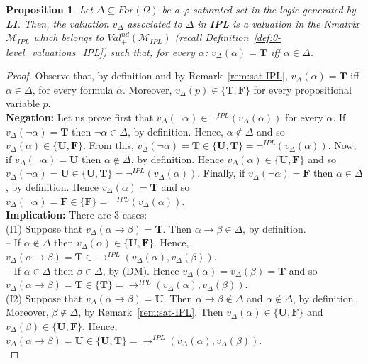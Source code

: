 \documentclass[12pt]{article}
\newtheorem{proposition}[theorem]{Proposition}
\newcommand{\bT}{\mathbf{T}}
\newcommand{\bU}{\mathbf{U}}
\newcommand{\bF}{\mathbf{F}}
\begin{document}
\begin{proposition} \label{prop:val-Delta-IPL}
Let $\Delta \subseteq For(\Omega)$ be a $\varphi$-saturated set in the logic generated by {\bf LI}. Then, the valuation $v_\Delta$ associated to $\Delta$ in \textbf{IPL} is a valuation in the Nmatrix $\mathcal{M}_{IPL}$ which belongs to $Val^{nd}_+(\mathcal{M}_{IPL})$ (recall Definition~\ref{def:0-level_valuations_IPL}) such that, for every $\alpha$: $v_\Delta(\alpha)=\bT$ iff $\alpha \in \Delta$.
\end{proposition}
\begin{proof} Observe that, by definition and  by Remark~\ref{rem:sat-IPL}, $v_\Delta(\alpha)=\bT$ iff $\alpha \in \Delta$, for every formula $\alpha$. Moreover, $v_\Delta(p) \in\{\bT,\bF\}$ for every propositional variable $p$.\\[1mm]
{\bf Negation:} Let us prove first that $v_\Delta(\neg\alpha) \in \neg^{IPL}(v_\Delta(\alpha))$ for every $\alpha$. If $v_\Delta(\neg\alpha)=\bT$ then $\neg\alpha \in \Delta$, by definition. Hence, $\alpha \notin \Delta$ and so $v_\Delta(\alpha) \in \{\bU,\bF\}$. From this, $v_\Delta(\neg\alpha) = \bT \in \{\bU,\bT\}=\neg^{IPL}(v_\Delta(\alpha))$. Now, if $v_\Delta(\neg\alpha)=\bU$ then $\alpha \notin \Delta$, by definition. Hence $v_\Delta(\alpha) \in \{\bU,\bF\}$ and so $v_\Delta(\neg\alpha) = \bU \in \{\bU,\bT\}=\neg^{IPL}(v_\Delta(\alpha))$. Finally,   if $v_\Delta(\neg\alpha)=\bF$ then $\alpha \in \Delta$, by definition. Hence $v_\Delta(\alpha)=\bT$ and so $v_\Delta(\neg\alpha) = \bF \in \{\bF\}=\neg^{IPL}(v_\Delta(\alpha))$.\\[1mm]
{\bf Implication:} There are 3 cases:\\
(I1) Suppose that $v_\Delta(\alpha \to \beta)=\bT$. Then $\alpha \to \beta \in \Delta$, by definition.\\
-- If $\alpha \notin \Delta$ then $v_\Delta(\alpha) \in \{\bU,\bF\}$. Hence, $v_\Delta(\alpha \to \beta)=\bT \in {\to}^{IPL}(v_\Delta(\alpha),v_\Delta(\beta))$.\\
-- If $\alpha \in \Delta$ then $\beta \in \Delta$, by (DM).  Hence  $v_\Delta(\alpha)=v_\Delta(\beta)=\bT$ and so $v_\Delta(\alpha \to \beta)=\bT \in \{\bT\}= {\to}^{IPL}(v_\Delta(\alpha),v_\Delta(\beta))$.\\
(I2)  Suppose that $v_\Delta(\alpha \to \beta)=\bU$. Then $\alpha \to \beta \notin \Delta$ and $\alpha \notin\Delta$, by definition. Moreover, $\beta \notin\Delta$, by Remark~\ref{rem:sat-IPL}. Then $v_\Delta(\alpha) \in \{\bU,\bF\}$ and  $v_\Delta(\beta) \in \{\bU,\bF\}$. Hence, $v_\Delta(\alpha \to \beta)=\bU \in \{\bU,\bT\}={\to}^{IPL}(v_\Delta(\alpha),v_\Delta(\beta))$.\\

\end{proof}
\end{document}
